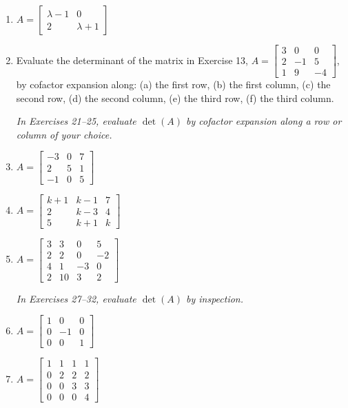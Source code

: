 \documentclass{article}
\theoremstyle{mystyle}
\begin{document}
\begin{enumerate}
\item[17.] $A=\begin{bmatrix}\lambda-1&0\\2&\lambda+1\end{bmatrix}$

\item[19.] Evaluate the determinant of the matrix in Exercise 13,
$A=\begin{bmatrix}3&0&0\\2&-1&5\\1&9&-4\end{bmatrix}$,
by cofactor expansion along: (a) the first row,\; (b) the first column,\;
(c) the second row,\; (d) the second column,\; (e) the third row,\; (f) the third column.

\noindent\textit{In Exercises 21--25, evaluate $\det(A)$ by cofactor expansion along a row or column of your choice.}

\item[21.] $A=\begin{bmatrix}-3&0&7\\2&5&1\\-1&0&5\end{bmatrix}$

\item[24.] $A=\begin{bmatrix}k+1&k-1&7\\2&k-3&4\\5&k+1&k\end{bmatrix}$

\item[25.] $A=\begin{bmatrix}3&3&0&5\\2&2&0&-2\\4&1&-3&0\\2&10&3&2\end{bmatrix}$

\noindent\textit{In Exercises 27--32, evaluate $\det(A)$ by inspection.}

\item[27.] $A=\begin{bmatrix}1&0&0\\0&-1&0\\0&0&1\end{bmatrix}$

\item[30.] $A=\begin{bmatrix}1&1&1&1\\0&2&2&2\\0&0&3&3\\0&0&0&4\end{bmatrix}$


\end{enumerate}
\end{document}
